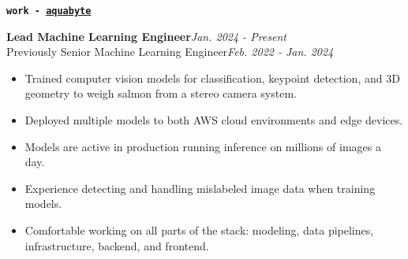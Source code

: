 \documentclass{article}[14pt]
\newenvironment{cvsection}[2] {
  \begin{tcolorbox}[
    standard jigsaw, %
    opacityback=0,   %
    top=0mm,         %
    bottom=0mm,      %
    boxrule=0pt,     %
    enhanced,        %
    frame code={
      \path[draw=#2,line width=3pt]
        (frame.south west) --
        ([yshift=-0.29cm] frame.north west) --
        ([yshift=-0.29cm, xshift=0.2\linewidth] frame.north west);
    }
  ]
  \hspace{0.20\linewidth}
  \textbf{\texttt{\Large{#1}}}
  \large
  \vspace{5pt}
  \newline
}
{ \end{tcolorbox} }
\newenvironment{tightemize}
{\vspace{-2pt}\begin{itemize}[leftmargin=*]\itemsep4pt \parskip0pt \parsep0pt}
{\end{itemize}}
\newcommand{\role}[2]{{\large\textbf{#1}\hfill\textit{#2}}}
\newcommand{\pastrole}[2]{{Previously #1\hfill\textit{#2}}}
\begin{document}
\vspace{1pt}
\begin{cvsection}{work - \href{https://aquabyte.ai/}{aquabyte}}{C1}
  \role{Lead Machine Learning Engineer}{Jan. 2024 - Present}\\
  \pastrole{Senior Machine Learning Engineer}{Feb. 2022 - Jan. 2024}
  \begin{tightemize}
    \item Trained computer vision models for classification, keypoint detection, and
      3D geometry to weigh salmon from a stereo camera system.
    \item Deployed multiple models to both AWS cloud environments and edge devices.
    \item Models are active in production running inference on millions of images a day.
    \item Experience detecting and handling mislabeled image data when training models.
    \item Comfortable working on all parts of the stack: modeling, data pipelines, infrastructure, backend, and frontend.






  \end{tightemize}
\end{cvsection}
\end{document}
